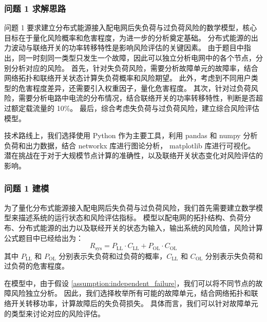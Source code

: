 \documentclass{article}
\begin{document}
\subsubsection{问题 1 求解思路}\label{subsubsec:problem1_idea}

问题 1 要求建立分布式能源接入配电网后失负荷与过负荷风险的数学模型，核心目标在于量化风险概率和危害程度，为进一步的分析奠定基础。
分布式能源的出力波动与联络开关的功率转移特性是影响风险评估的关键因素。
由于题目中指出，同一时刻同一类型只发生一个故障，因此可以独立分析电网中的各个节点，分别分析对应的风险。
首先，针对失负荷风险，需要分析故障单元的故障率，结合网络拓扑和联络开关状态计算失负荷概率和风险期望。
此外，考虑到不同用户类型的危害程度差异，还需要引入权重因子，量化危害程度。
其次，针对过负荷风险，需要分析电路中电流的分布情况，结合联络开关的功率转移特性，判断是否超过额定载流量的 10\%。
最后，综合考虑失负荷与过负荷风险，建立综合风险评估模型。

技术路线上，我们选择使用 Python 作为主要工具，利用 pandas 和 numpy 分析负荷和出力数据，结合 networkx 库进行图论分析， matplotlib 库进行可视化。
潜在挑战在于对于大规模节点计算的准确性，以及联络开关状态变化对风险评估的影响。

\subsubsection{问题 1 建模}\label{subsubsec:problem1_model}

为了量化分布式能源接入配电网后失负荷与过负荷风险，我们首先需要建立数学模型来描述系统的运行状态和风险评估指标。
模型以配电网的拓扑结构、负荷分布、分布式能源的出力以及联经开关的状态为输入，输出系统的风险值，风险计算公式题目中已经给出为：
\begin{equation}\label{eq:risk_formula}
  R_{\text{sys}} = P_{\text{LL}} \cdot C_{\text{LL}} + P_{\text{OL}} \cdot C_{\text{OL}}
\end{equation}
其中 $P_{\text{LL}}$ 和 $P_{\text{OL}}$ 分别表示失负荷和过负荷的概率，$C_{\text{LL}}$ 和 $C_{\text{OL}}$ 分别表示失负荷和过负荷的危害程度。

在模型中，由于假设 \ref{assumption:independent_failure}，我们可以将不同节点的故障风险独立分析。
因此，我们选择枚举所有可能的故障单元，结合网络拓扑和联络开关转移功率，计算故障后的失负荷损失。
具体而言，我们可以针对故障单元的类型来讨论对应的风险评估。
\end{document}

